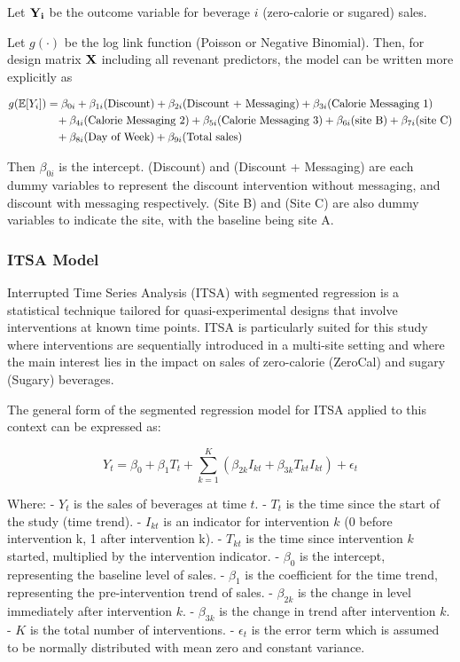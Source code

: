 \documentclass[
]{article}
\begin{document}
Let \({\bf Y_i}\) be the outcome variable for beverage \(i\)
(zero-calorie or sugared) sales.

Let \(g(\cdot)\) be the log link function (Poisson or Negative
Binomial). Then, for design matrix \({\bf X}\) including all revenant
predictors, the model can be written more explicitly as

\begin{align*}
g(\mathbb{E}[Y_i]) &= \beta_{0i} + \beta_{1i} (\text{Discount}) + \beta_{2i} (\text{Discount + Messaging}) + \beta_{3i} (\text{Calorie Messaging 1})  \\
&\hspace{3mm} + \beta_{4i} (\text{Calorie Messaging 2}) + \beta_{5i} (\text{Calorie Messaging 3}) + \beta_{6i} (\text{site B}) + \beta_{7i} (\text{site C})\\
&\hspace{3mm} + \beta_{8i} (\text{Day of Week})+ \beta_{9i} (\text{Total sales})
\end{align*}

Then \(\beta_{0i}\) is the intercept. (Discount) and (Discount +
Messaging) are each dummy variables to represent the discount
intervention without messaging, and discount with messaging
respectively. (Site B) and (Site C) are also dummy variables to indicate
the site, with the baseline being site A.

\hypertarget{itsa-model}{%
\subsubsection{ITSA Model}\label{itsa-model}}

Interrupted Time Series Analysis (ITSA) with segmented regression is a
statistical technique tailored for quasi-experimental designs that
involve interventions at known time points. ITSA is particularly suited
for this study where interventions are sequentially introduced in a
multi-site setting and where the main interest lies in the impact on
sales of zero-calorie (ZeroCal) and sugary (Sugary) beverages.

The general form of the segmented regression model for ITSA applied to
this context can be expressed as:

\[Y_t = \beta_0 + \beta_1 T_t + \sum_{k=1}^{K} (\beta_{2k} I_{kt} + \beta_{3k} T_{kt} I_{kt}) + \epsilon_t \]

Where: - \(Y_t\) is the sales of beverages at time \(t\). - \(T_t\) is
the time since the start of the study (time trend). - \(I_{kt}\) is an
indicator for intervention \(k\) (0 before intervention k, 1 after
intervention k). - \(T_{kt}\) is the time since intervention \(k\)
started, multiplied by the intervention indicator. - \(\beta_0\) is the
intercept, representing the baseline level of sales. - \(\beta_1\) is
the coefficient for the time trend, representing the pre-intervention
trend of sales. - \(\beta_{2k}\) is the change in level immediately
after intervention \(k\). - \(\beta_{3k}\) is the change in trend after
intervention \(k\). - \(K\) is the total number of interventions. -
\(\epsilon_t\) is the error term which is assumed to be normally
distributed with mean zero and constant variance.
\end{document}
